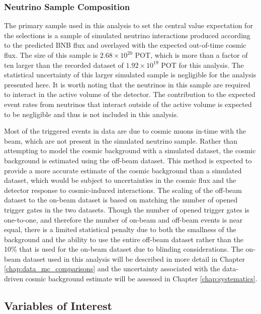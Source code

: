 \subsubsection{Neutrino Sample Composition}
\label{sec:neutrino_sample_composition}
The primary sample used in this analysis to set the central value expectation for the selections is a sample of simulated neutrino interactions produced according to the predicted BNB flux and overlayed with the expected out-of-time cosmic flux. The size of this sample is $2.68 \times 10^{20}$ POT, which is more than a factor of ten larger than the recorded dataset of $1.92 \times 10^{19}$ POT for this analysis. The statistical uncertainty of this larger simulated sample is negligible for the analysis presented here. It is worth noting that the neutrinos in this sample are required to interact in the active volume of the detector. The contribution to the expected event rates from neutrinos that interact outside of the active volume is expected to be negligible and thus is not included in this analysis.

Most of the triggered events in data are due to cosmic muons in-time with the beam, which are not present in the simulated neutrino sample. Rather than attempting to model the cosmic background with a simulated dataset, the cosmic background is estimated using the off-beam dataset. This method is expected to provide a more accurate estimate of the cosmic background than a simulated dataset, which would be subject to uncertainties in the cosmic flux and the detector response to cosmic-induced interactions. The scaling of the off-beam dataset to the on-beam dataset is based on matching the number of opened trigger gates in the two datasets. Though the number of opened trigger gates is one-to-one, and therefore the number of on-beam and off-beam events is near equal, there is a limited statistical penalty due to both the smallness of the background and the ability to use the entire off-beam dataset rather than the 10\% that is used for the on-beam dataset due to blinding considerations. The on-beam dataset used in this analysis will be described in more detail in Chapter \ref{chap:data_mc_comparisons} and the uncertainty associated with the data-driven cosmic background estimate will be assessed in Chapter \ref{chap:systematics}.

\subsection{Variables of Interest}
\label{sec:variables_of_interest}

